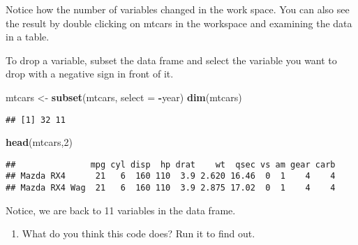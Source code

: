 \documentclass[]{article}
\newenvironment{Shaded}{\begin{snugshade}}{\end{snugshade}}
\newcommand{\KeywordTok}[1]{\textcolor[rgb]{0.13,0.29,0.53}{\textbf{#1}}}
\newcommand{\DataTypeTok}[1]{\textcolor[rgb]{0.13,0.29,0.53}{#1}}
\newcommand{\DecValTok}[1]{\textcolor[rgb]{0.00,0.00,0.81}{#1}}
\newcommand{\StringTok}[1]{\textcolor[rgb]{0.31,0.60,0.02}{#1}}
\newcommand{\OperatorTok}[1]{\textcolor[rgb]{0.81,0.36,0.00}{\textbf{#1}}}
\newcommand{\NormalTok}[1]{#1}
\providecommand{\tightlist}{%
  \setlength{\itemsep}{0pt}\setlength{\parskip}{0pt}}
\begin{document}
Notice how the number of variables changed in the work space. You can
also see the result by double clicking on mtcars in the workspace and
examining the data in a table.

To drop a variable, subset the data frame and select the variable you
want to drop with a negative sign in front of it.

\begin{Shaded}
\begin{Highlighting}[]
\NormalTok{mtcars <-}\StringTok{ }\KeywordTok{subset}\NormalTok{(mtcars, }\DataTypeTok{select =} \OperatorTok{-}\NormalTok{year)}
\KeywordTok{dim}\NormalTok{(mtcars)}
\end{Highlighting}
\end{Shaded}

\begin{verbatim}
## [1] 32 11
\end{verbatim}

\begin{Shaded}
\begin{Highlighting}[]
\KeywordTok{head}\NormalTok{(mtcars,}\DecValTok{2}\NormalTok{)}
\end{Highlighting}
\end{Shaded}

\begin{verbatim}
##               mpg cyl disp  hp drat    wt  qsec vs am gear carb
## Mazda RX4      21   6  160 110  3.9 2.620 16.46  0  1    4    4
## Mazda RX4 Wag  21   6  160 110  3.9 2.875 17.02  0  1    4    4
\end{verbatim}

Notice, we are back to 11 variables in the data frame.

\begin{enumerate}
\def\labelenumi{\arabic{enumi}.}
\setcounter{enumi}{8}
\tightlist
\item
  What do you think this code does? Run it to find out.
\end{enumerate}

\begin{Shaded}
\end{Shaded}
\end{document}

